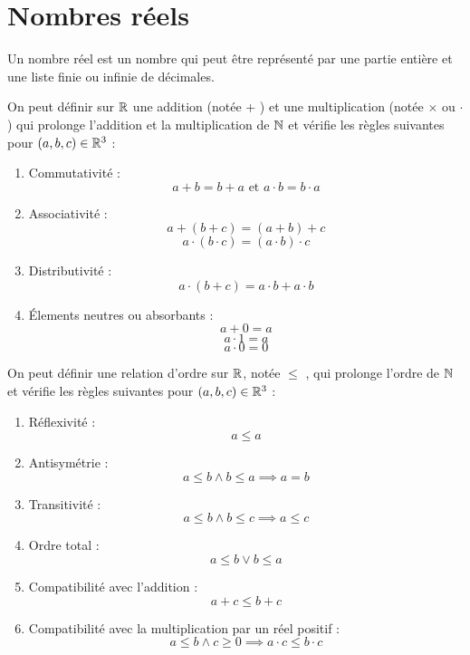\chapter{Nombres réels}\label{chap:nb_reels}

\begin{definition}
    Un nombre réel est un nombre qui peut être représenté par une partie entière et une liste finie ou infinie de décimales.
\end{definition}

\begin{proposition}
    On peut définir sur $\mathbb{R}$ une addition (notée \og + \fg) et une multiplication (notée \og $\times$ \fg ou \og $\cdot$ \fg) qui prolonge l'addition et la multiplication de $\mathbb{N}$ et vérifie les règles suivantes pour $(a, b, c) \in \mathbb{R}^3$ :
    \begin{enumerate}
        \item Commutativité : 
        \[ a + b = b + a \text{ et } a \cdot b = b \cdot a \]
        \item Associativité : 
        \[ a + (b + c) = (a + b) + c \]
        \[ a \cdot (b \cdot c) = (a \cdot b) \cdot c \]
        \item Distributivité : 
        \[ a \cdot (b + c) = a \cdot b + a \cdot b \]
        \item \'Elements neutres ou absorbants :
        \[ a + 0 = a \]
        \[ a \cdot 1 = a \]
        \[a \cdot 0 = 0 \]
    \end{enumerate}
\end{proposition}

\begin{proposition}
    On peut définir une relation d'ordre sur $\mathbb{R}$, notée \og $\leq$ \fg, qui prolonge l'ordre de $\mathbb{N}$ et vérifie les règles suivantes pour $(a, b, c) \in \mathbb{R}^3$ :
    \begin{enumerate}
        \item Réflexivité : 
        \[ a \leq a \]
        \item Antisymétrie : 
        \[ a \leq b \land b \leq a \implies a = b \]
        \item Transitivité : 
        \[ a \leq b \land b \leq c \implies a \leq c \]
        \item Ordre total : 
        \[ a \leq b \lor b \leq a \]
        \item Compatibilité avec l'addition :
        \[ a + c \leq b + c \]
        \item Compatibilité avec la multiplication par un réel positif :
        \[ a \leq b \land c \geq 0 \implies a \cdot c \leq b \cdot c \]
    \end{enumerate}
\end{proposition}

